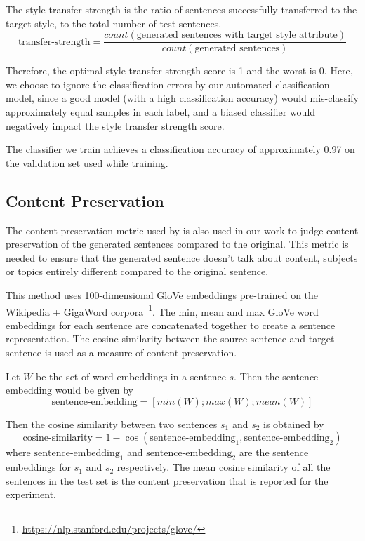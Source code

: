 The style transfer strength is the ratio of sentences successfully transferred to the target style, to the total number of test sentences.
\begin{equation*}
	\text{transfer-strength} = \frac{count(\text{generated sentences with target style attribute})}{count(\text{generated sentences})}
\end{equation*}

Therefore, the optimal style transfer strength score is 1 and the worst is 0. Here, we choose to ignore the classification errors by our automated classification model, since a good model (with a high classification accuracy) would mis-classify approximately equal samples in each label, and a biased classifier would negatively impact the style transfer strength score.

The classifier we train achieves a classification accuracy of approximately 0.97 on the validation set used while training.

\subsection{Content Preservation} \label{ssec:content-preservation-metric}

The content preservation metric used by \cite{fu2017style} is also used in our work to judge content preservation of the generated sentences compared to the original. This metric is needed to ensure that the generated sentence doesn't talk about content, subjects or topics entirely different compared to the original sentence.

This method uses 100-dimensional GloVe embeddings \citep{pennington2014glove} pre-trained on the Wikipedia + GigaWord corpora~\footnote{\url{https://nlp.stanford.edu/projects/glove/}}. The min, mean and max GloVe word embeddings for each sentence are concatenated together to create a sentence representation. The cosine similarity between the source sentence and target sentence is used as a measure of content preservation.

Let $W$ be the set of word embeddings in a sentence $s$. Then the sentence embedding would be given by
\begin{equation*}
	\text{sentence-embedding} = [min(W);max(W);mean(W)]
\end{equation*}

Then the cosine similarity between two sentences $s_1$ and $s_2$ is obtained by
\begin{equation*}
	\text{cosine-similarity} = 1 - \cos(\text{sentence-embedding}_1, \text{sentence-embedding}_2)
\end{equation*}
where $\text{sentence-embedding}_1$ and $\text{sentence-embedding}_2$ are the sentence embeddings for $s_1$ and $s_2$ respectively. The mean cosine similarity of all the sentences in the test set is the content preservation that is reported for the experiment.

